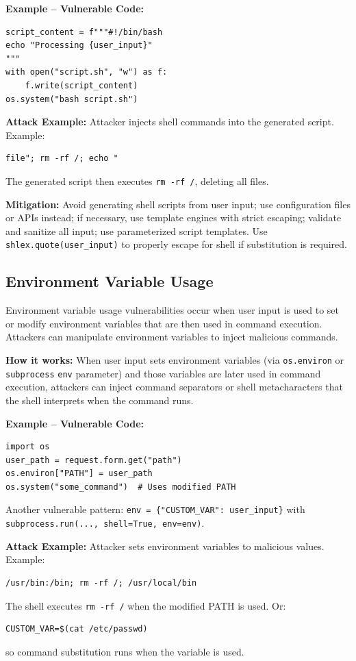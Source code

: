 \textbf{Example -- Vulnerable Code:}

\begin{lstlisting}[style=pycode]
script_content = f"""#!/bin/bash
echo "Processing {user_input}"
"""
with open("script.sh", "w") as f:
    f.write(script_content)
os.system("bash script.sh")
\end{lstlisting}

\textbf{Attack Example:} Attacker injects shell commands into the generated script. Example:
\begin{lstlisting}[style=attackcode]
file"; rm -rf /; echo "
\end{lstlisting}
The generated script then executes \texttt{rm -rf /}, deleting all files.

\textbf{Mitigation:} Avoid generating shell scripts from user input; use configuration files or APIs instead; if necessary, use template engines with strict escaping; validate and sanitize all input; use parameterized script templates. Use \texttt{shlex.quote(user\_input)} to properly escape for shell if substitution is required.

\subsection{Environment Variable Usage}
\label{sec:cmd_env_var}

Environment variable usage vulnerabilities occur when user input is used to set or modify environment variables that are then used in command execution. Attackers can manipulate environment variables to inject malicious commands.

\textbf{How it works:} When user input sets environment variables (via \texttt{os.environ} or \texttt{subprocess} \texttt{env} parameter) and those variables are later used in command execution, attackers can inject command separators or shell metacharacters that the shell interprets when the command runs.

\textbf{Example -- Vulnerable Code:}

\begin{lstlisting}[style=pycode]
import os
user_path = request.form.get("path")
os.environ["PATH"] = user_path
os.system("some_command")  # Uses modified PATH
\end{lstlisting}
Another vulnerable pattern: \texttt{env = \{"CUSTOM\_VAR": user\_input\}} with \texttt{subprocess.run(..., shell=True, env=env)}.

\textbf{Attack Example:} Attacker sets environment variables to malicious values. Example:
\begin{lstlisting}[style=attackcode]
/usr/bin:/bin; rm -rf /; /usr/local/bin
\end{lstlisting}
The shell executes \texttt{rm -rf /} when the modified PATH is used. Or:
\begin{lstlisting}[style=attackcode]
CUSTOM_VAR=$(cat /etc/passwd)
\end{lstlisting}
so command substitution runs when the variable is used.

